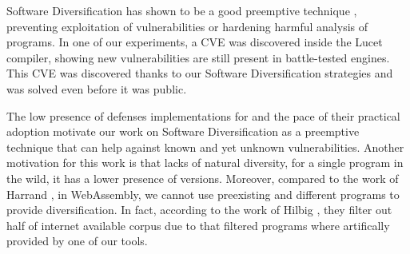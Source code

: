 Software Diversification has shown to be a good preemptive technique \citationneeded, preventing exploitation of vulnerabilities or hardening harmful analysis of programs. In one of our experiments, a CVE was discovered inside the Lucet compiler, showing new vulnerabilities are still present in battle-tested engines. This CVE was discovered thanks to our Software Diversification strategies and was solved even before it was public. 






The low presence of defenses implementations for \wasm and the pace of their practical adoption motivate our work on Software Diversification  as a preemptive technique that can help against known and yet unknown vulnerabilities.
Another motivation for this work is that \wasm lacks of natural diversity, \ie for a single \wasm program in the wild, it has a lower presence of versions. Moreover, compared to the work of Harrand \etal \cite{Harrand1650630}, in WebAssembly, we cannot use preexisting and different programs to provide diversification. In fact, according to the work of Hilbig \etal \cite{Hilbig2021AnES}, they filter out half of internet available \wasm corpus due to that filtered programs where artifically provided by one of our tools. 







